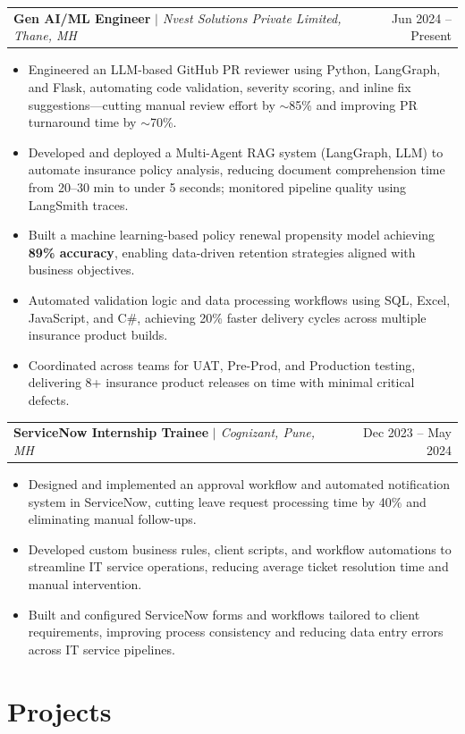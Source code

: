 \documentclass[10pt, letterpaper]{article}
\makeatletter
\newcommand{\resumeItem}[1]{%
  \item\small{#1}
}
\newcommand{\resumeSubheading}[4]{%
  \vspace{2pt}
  \begin{tabular*}{\textwidth}{@{}l@{\extracolsep{\fill}}r@{}}
    \textbf{#1} \textit{\small $|$ #2} & \small #3 -- #4 \\
  \end{tabular*}\vspace{-4pt}
}
\makeatother
\begin{document}
\resumeSubheading{Gen AI/ML Engineer}{Nvest Solutions Private Limited, Thane, MH}{Jun 2024}{Present}
\begin{itemize}
  \resumeItem{Engineered an LLM-based GitHub PR reviewer using Python, LangGraph, and Flask, automating code validation, severity scoring, and inline fix suggestions---cutting manual review effort by $\sim$85\% and improving PR turnaround time by $\sim$70\%.}
  \resumeItem{Developed and deployed a Multi-Agent RAG system (LangGraph, LLM) to automate insurance policy analysis, reducing document comprehension time from 20--30 min to under 5 seconds; monitored pipeline quality using LangSmith traces.}
  \resumeItem{Built a machine learning-based policy renewal propensity model achieving \textbf{89\% accuracy}, enabling data-driven retention strategies aligned with business objectives.}
  \resumeItem{Automated validation logic and data processing workflows using SQL, Excel, JavaScript, and C\#, achieving 20\% faster delivery cycles across multiple insurance product builds.}
  \resumeItem{Coordinated across teams for UAT, Pre-Prod, and Production testing, delivering 8+ insurance product releases on time with minimal critical defects.}
\end{itemize}

\vspace{4pt}

\resumeSubheading{ServiceNow Internship Trainee}{Cognizant, Pune, MH}{Dec 2023}{May 2024}
\begin{itemize}
  \resumeItem{Designed and implemented an approval workflow and automated notification system in ServiceNow, cutting leave request processing time by 40\% and eliminating manual follow-ups.}
  \resumeItem{Developed custom business rules, client scripts, and workflow automations to streamline IT service operations, reducing average ticket resolution time and manual intervention.}
  \resumeItem{Built and configured ServiceNow forms and workflows tailored to client requirements, improving process consistency and reducing data entry errors across IT service pipelines.}
\end{itemize}

\vspace{-2pt}

\section{Projects}
\end{document}
